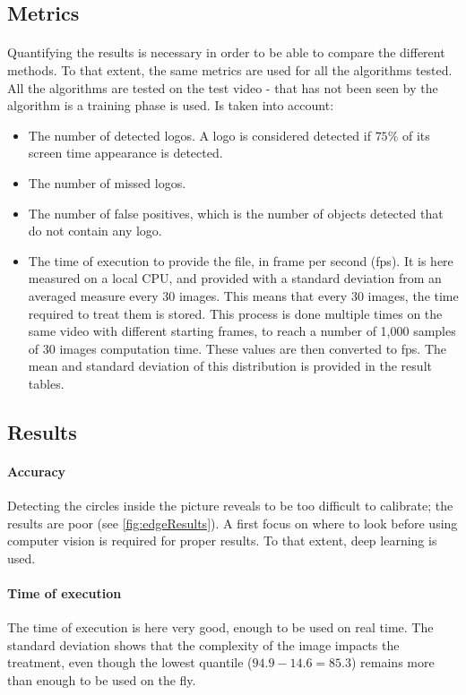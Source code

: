 \documentclass[12pt]{article}%
\begin{document}
\subsection{Metrics}

\paragraph{}
Quantifying the results is necessary in order to be able to compare the different methods. To that extent, the same metrics are used for all the algorithms tested. All the algorithms are tested on the test video - that has not been seen by the algorithm is a training phase is used. Is taken into account:
\begin{itemize}
    \item The number of detected logos. A logo is considered detected if $75\%$ of its screen time appearance is detected.
    \item The number of missed logos.
    \item The number of false positives, which is the number of objects detected that do not contain any logo.
    \item The time of execution to provide the  file, in frame per second (fps). It is here measured on a local CPU, and provided with a standard deviation from an averaged measure every 30 images. This means that every 30 images, the time required to treat them is stored. This process is done multiple times on the same video with different starting frames, to reach a number of 1,000 samples of 30 images computation time. These values are then converted to fps. The mean and standard deviation of this distribution is provided in the result tables.
\end{itemize}


\subsection{Results}
\paragraph{Accuracy}
Detecting the circles inside the picture reveals to be too difficult to calibrate; the results are poor (see \ref{fig:edgeResults}). A first focus on where to look before using computer vision is required for proper results. To that extent, deep learning is used.

\paragraph{Time of execution}
The time of execution is here very good, enough to be used on real time. The standard deviation shows that the complexity of the image impacts the treatment, even though the lowest quantile ($94.9 - 14.6 = 85.3$) remains more than enough to be used on the fly.
\end{document}
